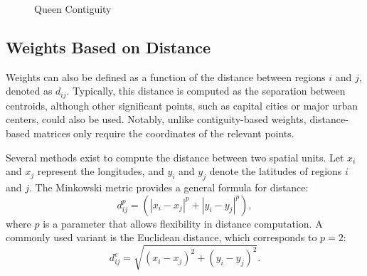 \documentclass[english,12pt]{book}\usepackage[]{graphicx}\usepackage[]{xcolor}
\begin{document}
\begin{figure}[h]
\caption{Queen Contiguity}
\label{fig:Queen_cont_grid}
\centering
{}
\end{figure}


\subsection{Weights Based on Distance}

Weights can also be defined as a function of the distance between regions $i$ and $j$, denoted as $d_{ij}$. Typically, this distance is computed as the separation between centroids, although other significant points, such as capital cities or major urban centers, could also be used. Notably, unlike contiguity-based weights, distance-based matrices only require the coordinates of the relevant points.

Several methods exist to compute the distance between two spatial units. Let $x_i$ and $x_j$ represent the longitudes, and $y_i$ and $y_j$ denote the latitudes of regions $i$ and $j$. The Minkowski metric provides a general formula for distance:
\begin{equation*}
  d_{ij}^p = \left(\left|x_i - x_j\right|^p + \left|y_i - y_j\right|^p\right),
\end{equation*}
%
where $p$ is a parameter that allows flexibility in distance computation. A commonly used variant is the Euclidean distance, which corresponds to $p = 2$:
\begin{equation*}
  d_{ij}^e = \sqrt{(x_i - x_j)^2 + (y_i - y_j)^2}.
\end{equation*}
\end{document}
